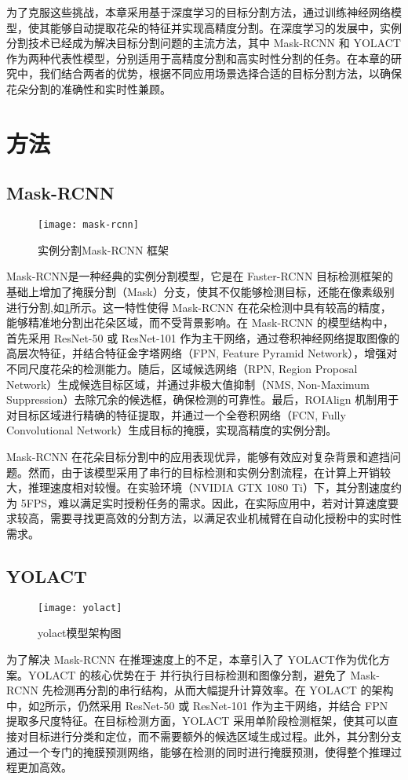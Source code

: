 为了克服这些挑战，本章采用基于深度学习的目标分割方法，通过训练神经网络模型，使其能够自动提取花朵的特征并实现高精度分割。在深度学习的发展中，实例分割技术已经成为解决目标分割问题的主流方法，其中 Mask-RCNN 和 YOLACT 作为两种代表性模型，分别适用于高精度分割和高实时性分割的任务。在本章的研究中，我们结合两者的优势，根据不同应用场景选择合适的目标分割方法，以确保花朵分割的准确性和实时性兼顾。

\section{方法}
\subsection{Mask-RCNN}
 \begin{figure}[htb]
	\texttt{[image: mask-rcnn]}
	\caption[实例分割Mask-RCNN 框架]{实例分割Mask-RCNN 框架} %
	\label{fig:mask-rcnn}
\end{figure}
Mask-RCNN\cite{he2017mask}是一种经典的实例分割模型，它是在 Faster-RCNN 目标检测框架的基础上增加了掩膜分割（Mask）分支，使其不仅能够检测目标，还能在像素级别进行分割,如\cref{fig:mask-rcnn}所示。这一特性使得 Mask-RCNN 在花朵检测中具有较高的精度，能够精准地分割出花朵区域，而不受背景影响。在 Mask-RCNN 的模型结构中，首先采用 ResNet-50 或 ResNet-101 作为主干网络，通过卷积神经网络提取图像的高层次特征，并结合特征金字塔网络（FPN, Feature Pyramid Network），增强对不同尺度花朵的检测能力。随后，区域候选网络（RPN, Region Proposal Network）生成候选目标区域，并通过非极大值抑制（NMS, Non-Maximum Suppression）去除冗余的候选框，确保检测的可靠性。最后，ROIAlign 机制用于对目标区域进行精确的特征提取，并通过一个全卷积网络（FCN, Fully Convolutional Network）生成目标的掩膜，实现高精度的实例分割。

Mask-RCNN 在花朵目标分割中的应用表现优异，能够有效应对复杂背景和遮挡问题。然而，由于该模型采用了串行的目标检测和实例分割流程，在计算上开销较大，推理速度相对较慢。在实验环境（NVIDIA GTX 1080 Ti）下，其分割速度约为 5FPS，难以满足实时授粉任务的需求。因此，在实际应用中，若对计算速度要求较高，需要寻找更高效的分割方法，以满足农业机械臂在自动化授粉中的实时性需求。

\subsection{YOLACT}
 \begin{figure}[htb]
	\texttt{[image: yolact]}
	\caption[yolact模型架构图]{yolact模型架构图} %
	\label{fig:yolact}
\end{figure}
为了解决 Mask-RCNN 在推理速度上的不足，本章引入了 YOLACT\cite{bolya2019yolact}作为优化方案。YOLACT 的核心优势在于 并行执行目标检测和图像分割，避免了 Mask-RCNN 先检测再分割的串行结构，从而大幅提升计算效率。在 YOLACT 的架构中，如\cref{fig:yolact}所示，仍然采用 ResNet-50 或 ResNet-101 作为主干网络，并结合 FPN 提取多尺度特征。在目标检测方面，YOLACT 采用单阶段检测框架，使其可以直接对目标进行分类和定位，而不需要额外的候选区域生成过程。此外，其分割分支通过一个专门的掩膜预测网络，能够在检测的同时进行掩膜预测，使得整个推理过程更加高效。


